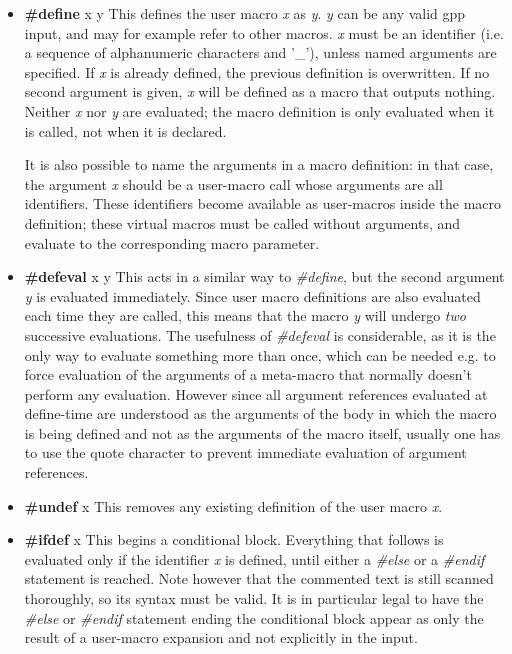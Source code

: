 \begin{itemize}

\item {\bf \#define }x y\htmlBR
This defines the user macro {\it x} as {\it y}. {\it y} can be any valid gpp
input, and may for example refer to other macros. {\it x} must be an
identifier (i.e. a sequence of alphanumeric characters and '\_'), unless named
arguments are specified. If {\it x} is already defined, the previous
definition is overwritten. If no second argument is given, {\it x} will be
defined as a macro that outputs nothing. Neither {\it x} nor {\it y} are
evaluated; the macro definition is only evaluated when it is called, not when
it is declared. 

It is also possible to name the arguments in a macro definition: in that case,
the argument {\it x} should be a user-macro call whose arguments are all
identifiers. These identifiers become available as user-macros inside the
macro definition; these virtual macros must be called without arguments, and
evaluate to the corresponding macro parameter. 

\item {\bf \#defeval }x y\htmlBR
This acts in a similar way to {\it \#define}, but the second argument {\it y}
is evaluated immediately. Since user macro definitions are also evaluated each
time they are called, this means that the macro {\it y} will undergo {\it two}
successive evaluations. The usefulness of {\it \#defeval} is considerable, as
it is the only way to evaluate something more than once, which can be needed
e.g. to force evaluation of the arguments of a meta-macro that normally
doesn't perform any evaluation. However since all argument references
evaluated at define-time are understood as the arguments of the body in which
the macro is being defined and not as the arguments of the macro itself,
usually one has to use the quote character to prevent immediate evaluation of
argument references. 

\item {\bf \#undef }x\htmlBR
This removes any existing definition of the user macro {\it x}. 

\item {\bf \#ifdef }x\htmlBR
This begins a conditional block. Everything that follows is evaluated only if
the identifier {\it x} is defined, until either a {\it \#else} or a {\it
\#endif} statement is reached. Note however that the commented text is still
scanned thoroughly, so its syntax must be valid. It is in particular legal to
have the {\it \#else} or {\it \#endif} statement ending the conditional block
appear as only the result of a user-macro expansion and not explicitly in the
input. 


\end{itemize}
